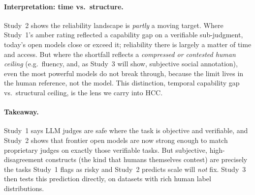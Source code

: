 \paragraph{Interpretation: time vs.\ structure.} Study~2 shows the reliability landscape is \emph{partly} a moving
target. Where Study~1's amber rating reflected a capability gap on a verifiable sub-judgment, today's open models
close or exceed it; reliability there is largely a matter of time and access. But where the shortfall reflects a
\emph{compressed or contested human ceiling} (e.g.\ fluency, and, as Study~3 will show, subjective social annotation),
even the most powerful models do not break through, because the limit lives in the human reference, not the model.
This distinction, temporal capability gap vs.\ structural ceiling, is the lens we carry into HCC.

\paragraph{Takeaway.} Study~1 says LLM judges are safe where the task is objective and verifiable, and
Study~2 shows that frontier open models are now strong enough to match proprietary judges on exactly those
verifiable tasks. But subjective, high-disagreement constructs (the kind that
humans themselves contest) are precisely the tasks Study~1 flags as risky and Study~2
predicts scale will \emph{not} fix. Study~3 then tests this prediction directly, on datasets with rich human label distributions.

